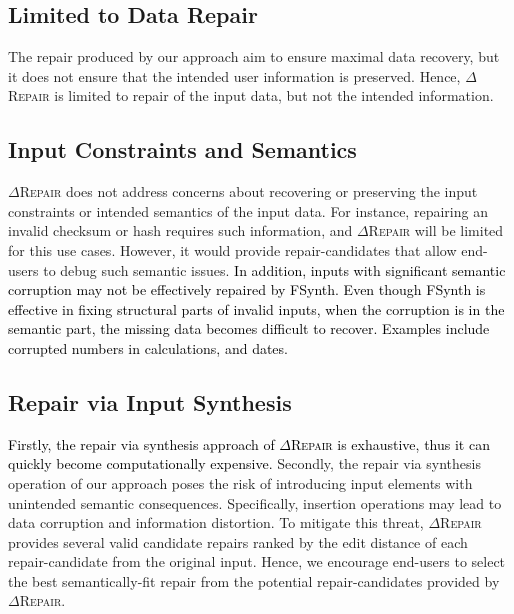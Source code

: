 \documentclass[acmsmall,screen,review,anonymous]{acmart}
\newcounter{todocounter}
\newcommand{\done}[1]{\marginpar{$*$}\textcolor{green}{\stepcounter{todocounter}\footnote[\thetodocounter]{\textcolor{black}{\textbf{DONE }}\textit{#1}}}}
\newcommand{\revise}[1]{\textcolor{black}{#1}}
\renewcommand{\done}[1]{} %
\renewcommand{\done}[1]{}
\newcommand{\approach}{\textsc{$\Delta$Repair}\xspace}
\begin{document}
\subsection{Limited to Data Repair} The repair produced by our approach aim to ensure maximal data recovery, but it does not ensure that the intended user information is preserved. Hence, \approach is limited to repair of the input data, but not the intended information. 


\subsection{Input Constraints and Semantics} \approach does not address concerns about recovering or preserving the input constraints or intended semantics of the input data. For instance, repairing an invalid checksum or hash requires such information, and \approach will be limited for this use cases. However, it would provide repair-candidates that allow end-users to debug such semantic issues. 
\revise{
In addition, inputs with significant semantic corruption may not be effectively repaired by FSynth. Even though FSynth is effective in fixing structural parts of invalid inputs, when the corruption is in the semantic part, the missing data becomes difficult to recover. Examples include corrupted numbers in calculations, and dates.}


\subsection{Repair via Input Synthesis} 
\revise{Firstly, the repair via synthesis approach of \approach is exhaustive, thus it can quickly become computationally expensive.} 
Secondly, the repair via synthesis operation %
of our approach poses the risk of introducing input elements with unintended semantic consequences. 
Specifically, insertion operations may lead %
to data corruption and information distortion. To mitigate this threat, \approach provides several valid candidate repairs ranked by the edit distance 
of each repair-candidate from the original input. %
Hence, we 
encourage end-users to select the best semantically-fit repair from the 
potential repair-candidates provided by \approach. 


\done{Do you talk about the risk of input synthesis (which may be perceived as greater than the risk of input deletion) somewhere? A small lexical change may have large semantical consequences -- AZ}
\end{document}
